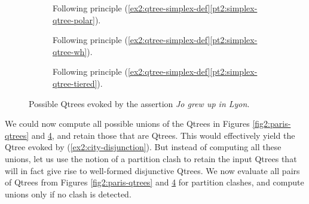 \begin{figure}[H]
	\centering
	\begin{subfigure}[t]{.23\linewidth}
		\centering
		\caption{Following principle (\ref{ex2:qtree-simplex-def}\ref{pt2:simplex-qtree-polar}).}\label{fig2:lyon-qtree-polar}
	\end{subfigure}
	\hfill
	\begin{subfigure}[t]{.33\linewidth}
		\centering		{}
		\caption{Following principle (\ref{ex2:qtree-simplex-def}\ref{pt2:simplex-qtree-wh}).}\label{fig2:lyon-qtree-wh}
	\end{subfigure}
	\hfill
	\begin{subfigure}[t]{.38\linewidth}
		\centering{}
		\caption{Following principle (\ref{ex2:qtree-simplex-def}\ref{pt2:simplex-qtree-tiered}).}\label{fig2:lyon-qtree-tiered}
	\end{subfigure}
	\caption{Possible Qtrees evoked by the assertion \textit{Jo grew up in Lyon}.}\label{fig2:lyon-qtrees}
\end{figure}

We could now compute all possible unions of the Qtrees in Figures \ref{fig2:paris-qtrees} and \ref{fig2:lyon-qtrees}, and retain those that are Qtrees. This would effectively yield the Qtree evoked by (\ref{ex2:city-disjunction}). But instead of computing all these unions, let us use the notion of a partition clash to retain the input Qtrees that will in fact give rise to well-formed disjunctive Qtrees. We now evaluate all pairs of Qtrees from Figures \ref{fig2:paris-qtrees} and \ref{fig2:lyon-qtrees} for partition clashes, and compute unions only if no clash is detected.

